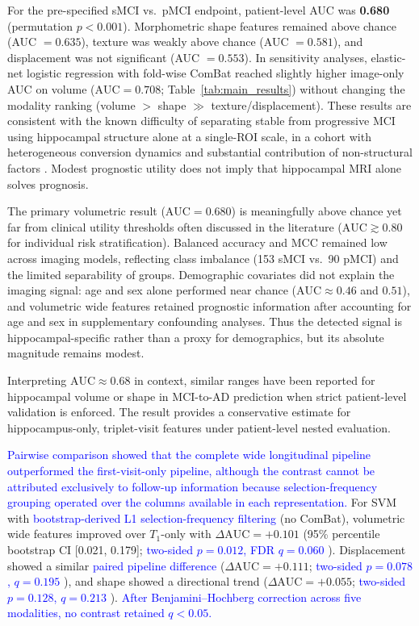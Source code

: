 \documentclass[review]{elsarticle}
\newcommand{\corrigir}[2]{%
	\textcolor{red}{\sout{#1}} %
	\textcolor{blue}{#2}%
}
\begin{document}
	For the pre-specified sMCI vs.\ pMCI endpoint, patient-level AUC was \textbf{0.680} (permutation $p<0.001$). Morphometric shape features remained above chance (AUC $=0.635$), texture was weakly above chance (AUC $=0.581$), and displacement was not significant (AUC $=0.553$). In sensitivity analyses, elastic-net logistic regression with fold-wise ComBat reached slightly higher image-only AUC on volume ($\mathrm{AUC}=0.708$; Table~\ref{tab:main_results}) without changing the modality ranking (volume $>$ shape $\gg$ texture/displacement). These results are consistent with the known difficulty of separating stable from progressive MCI using hippocampal structure alone at a single-ROI scale, in a cohort with heterogeneous conversion dynamics and substantial contribution of non-structural factors \cite{wyman-2013,scheltens-1992}. Modest prognostic utility does not imply that hippocampal MRI alone solves prognosis.
	
	The primary volumetric result ($\mathrm{AUC}=0.680$) is meaningfully above chance yet far from clinical utility thresholds often discussed in the literature ($\mathrm{AUC}\gtrsim 0.80$ for individual risk stratification). Balanced accuracy and MCC remained low across imaging models, reflecting class imbalance (153 sMCI vs.\ 90 pMCI) and the limited separability of groups. Demographic covariates did not explain the imaging signal: age and sex alone performed near chance ($\mathrm{AUC}\approx 0.46$ and $0.51$), and volumetric wide features retained prognostic information after accounting for age and sex in supplementary confounding analyses. Thus the detected signal is hippocampal-specific rather than a proxy for demographics, but its absolute magnitude remains modest.
	
	Interpreting $\mathrm{AUC}\approx 0.68$ in context, similar ranges have been reported for hippocampal volume or shape in MCI-to-AD prediction when strict patient-level validation is enforced. The result provides a conservative estimate for hippocampus-only, triplet-visit features under patient-level nested evaluation.
	
	\corrigir{}{Pairwise comparison showed that the complete wide longitudinal pipeline outperformed the first-visit-only pipeline, although the contrast cannot be attributed exclusively to follow-up information because selection-frequency grouping operated over the columns available in each representation.} For SVM with \corrigir{}{bootstrap-derived L1 selection-frequency filtering} (no ComBat), volumetric wide features improved over $T_1$-only with $\Delta\mathrm{AUC}=+0.101$ (95\% percentile bootstrap CI [0.021, 0.179]; \corrigir{}{two-sided $p=0.012$, FDR $q=0.060$}). Displacement showed a similar \corrigir{}{paired pipeline difference} ($\Delta\mathrm{AUC}=+0.111$; \corrigir{}{two-sided $p=0.078$, $q=0.195$}), and shape showed a directional trend ($\Delta\mathrm{AUC}=+0.055$; \corrigir{}{two-sided $p=0.128$, $q=0.213$}). \corrigir{}{After Benjamini--Hochberg correction across five modalities, no contrast retained $q<0.05$.}
	
\end{document}
